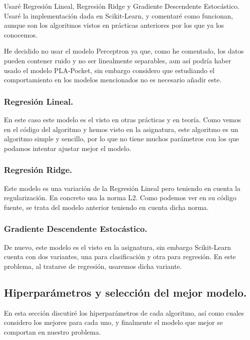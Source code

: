 \documentclass[12pt, spanish]{article}
\begin{document}
Usaré Regresión Lineal, Regresión Ridge y Gradiente Descendente Estocástico. Usaré la implementación dada en Scikit-Learn\cite{scikitlearnlinearmodels}, y comentaré como funcionan, aunque son los algoritmos vistos en prácticas anteriores por los que ya los conocemos.

He decidido no usar el modelo Perceptron ya que, como he comentado, los datos pueden contener ruido y no ser linealmente separables, aun así podría haber usado el modelo PLA-Pocket, sin embargo considero que estudiando el comportamiento en los modelos mencionados no es necesario añadir este.


\subsubsection{Regresión Lineal.}

En este caso este modelo es el visto en otras prácticas y en teoría. Como vemos en el código del algoritmo\cite{sourceLinReg} y hemos visto en la asignatura, este algoritmo es un algoritmo simple y sencillo, por lo que no tiene muchos parámetros con los que podamos intentar ajustar mejor el modelo.


\subsubsection{Regresión Ridge.}

Este modelo es una variación de la Regresión Lineal pero teniendo en cuenta la regularización. En concreto usa la norma L2. Como podemos ver en su código fuente\cite{sourceRidgeReg}, se trata del modelo anterior teniendo en cuenta dicha norma.


\subsubsection{Gradiente Descendente Estocástico.}

De nuevo, este modelo es el visto en la asignatura, sin embargo Scikit-Learn cuenta con dos variantes, una para clasificación y otra para regresión. En este problema, al tratarse de regresión, usaremos dicha variante\cite{sourceSGDReg}.


\newpage

\subsection{Hiperparámetros y selección del mejor modelo.}

En esta sección discutiré los hiperparámetros de cada algoritmo, así como cuales considero los mejores para cada uno, y finalmente el modelo que mejor se comportan en nuestro problema.
\end{document}
